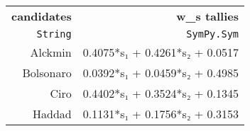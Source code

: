 \begin{table}
  \begin{tabular}{rr}
    \hline\hline
    \textbf{candidates} & \textbf{w_s tallies} \\
    \texttt{String} & \texttt{SymPy.Sym} \\\hline
    Alckmin & 0.4075*s₁ + 0.4261*s₂ + 0.0517 \\
    Bolsonaro & 0.0392*s₁ + 0.0459*s₂ + 0.4985 \\
    Ciro & 0.4402*s₁ + 0.3524*s₂ + 0.1345 \\
    Haddad & 0.1131*s₁ + 0.1756*s₂ + 0.3153 \\\hline\hline
  \end{tabular}
\end{table}
